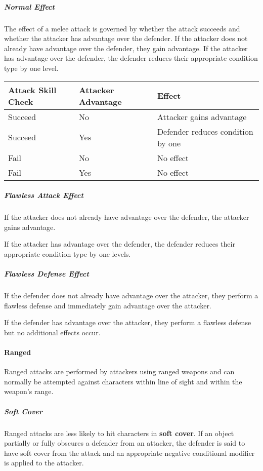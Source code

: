 \documentclass[11pt]{article}
\begin{document}
\subparagraph{Normal Effect}
The effect of a melee attack is governed by whether the attack succeeds and whether the attacker has advantage over the defender.
If the attacker does not already have advantage over the defender, they gain advantage.
If the attacker has advantage over the defender, the defender reduces their appropriate condition type by one level.
\begin{center}
	\begin{tabular}{lll}
		Attack Skill Check & Attacker Advantage & Effect                                              \\
		\hline
		Succeed            & No                 & Attacker gains advantage                            \\
		Succeed            & Yes                & Defender reduces condition by one \\
		Fail               & No                 & No effect                                           \\
		Fail               & Yes                & No effect                                           \\
	\end{tabular}
\end{center}

\subparagraph{Flawless Attack Effect}
If the attacker does not already have advantage over the defender, the attacker gains advantage.

If the attacker has advantage over the defender, the defender reduces their appropriate condition type by one levels.

\subparagraph{Flawless Defense Effect}
If the defender does not already have advantage over the attacker, they perform a flawless defense and immediately gain advantage over the attacker.

If the defender has advantage over the attacker, they perform a flawless defense but no additional effects occur.

\paragraph{Ranged}
Ranged attacks are performed by attackers using ranged weapons and can normally be attempted against characters within line of sight and within the weapon's range.

\subparagraph{Soft Cover}
Ranged attacks are less likely to hit characters in \textbf{soft cover}.
If an object partially or fully obscures a defender from an attacker, the defender is said to have soft cover from the attack and an appropriate negative conditional modifier is applied to the attacker.
\end{document}
